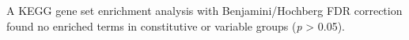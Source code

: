 \documentclass[../main.tex]{subfiles}
\begin{document}
{{A KEGG gene set enrichment analysis with Benjamini/Hochberg FDR correction found no enriched terms in constitutive or variable groups (\textit{p} \textgreater{} 0.05).

%		
%
%		
%
}}
\end{document}
